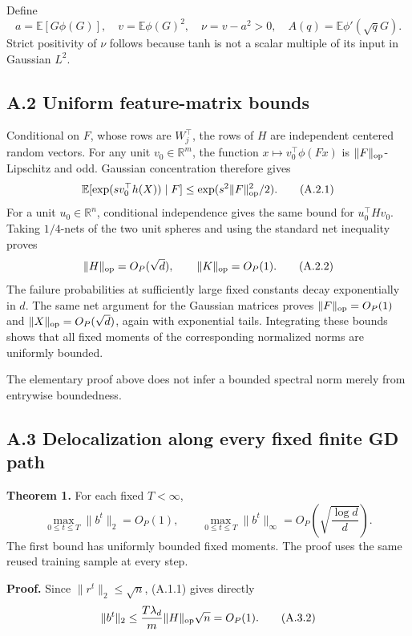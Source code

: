 \documentclass[
  11pt,
  a4paper,
]{article}
\begin{document}
Define \[
a=\mathbb E[G\phi(G)],\quad v=\mathbb E\phi(G)^2,\quad
\nu=v-a^2>0,
\quad A(q)=\mathbb E\phi'(\sqrt qG).
\tag{A.1.2}
\] Strict positivity of \(\nu\) follows because tanh is not a scalar
multiple of its input in Gaussian \(L^2\).

\hypertarget{a.2-uniform-feature-matrix-bounds}{%
\subsection{A.2 Uniform feature-matrix
bounds}\label{a.2-uniform-feature-matrix-bounds}}

Conditional on \(F\), whose rows are \(W_j^\top\), the rows of \(H\) are
independent centered random vectors. For any unit \(v_0\in\mathbb R^m\),
the function \(x\mapsto v_0^\top\phi(Fx)\) is
\(\|F\|_{\rm op}\)-Lipschitz and odd. Gaussian concentration therefore
gives \[
\mathbb E[\exp(sv_0^\top h(X))\mid F]
\le \exp(s^2\|F\|_{\rm op}^2/2).
\tag{A.2.1}
\] For a unit \(u_0\in\mathbb R^n\), conditional independence gives the
same bound for \(u_0^\top Hv_0\). Taking \(1/4\)-nets of the two unit
spheres and using the standard net inequality proves \[
\|H\|_{\rm op}=O_P(\sqrt d),\qquad
\|K\|_{\rm op}=O_P(1). \tag{A.2.2}
\] The failure probabilities at sufficiently large fixed constants decay
exponentially in \(d\). The same net argument for the Gaussian matrices
proves \(\|F\|_{\rm op}=O_P(1)\) and \(\|X\|_{\rm op}=O_P(\sqrt d)\),
again with exponential tails. Integrating these bounds shows that all
fixed moments of the corresponding normalized norms are uniformly
bounded.

The elementary proof above does not infer a bounded spectral norm merely
from entrywise boundedness.

\hypertarget{a.3-delocalization-along-every-fixed-finite-gd-path}{%
\subsection{A.3 Delocalization along every fixed finite GD
path}\label{a.3-delocalization-along-every-fixed-finite-gd-path}}

\textbf{Theorem 1.} For each fixed \(T<\infty\), \[
\max_{0\le t\le T}\|b^t\|_2=O_P(1),\qquad
\max_{0\le t\le T}\|b^t\|_\infty
=O_P\!\left(\sqrt{\frac{\log d}{d}}\right). \tag{A.3.1}
\] The first bound has uniformly bounded fixed moments. The proof uses
the same reused training sample at every step.

\textbf{Proof.} Since \(\|r^t\|_2\le\sqrt n\), (A.1.1) gives directly \[
\|b^t\|_2\le \frac{T\lambda_d}{m}\|H\|_{\rm op}\sqrt n=O_P(1). \tag{A.3.2}
\]
\end{document}
